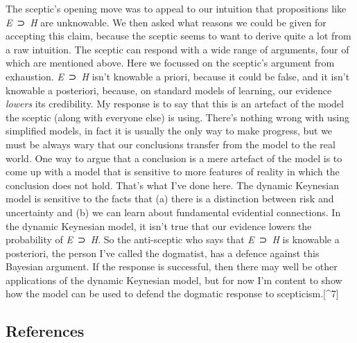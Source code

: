 \documentclass[
  10pt,
  letterpaper,
  DIV=11,
  numbers=noendperiod,
  twoside]{scrartcl}
\begin{document}
The sceptic's opening move was to appeal to our intuition that
propositions like \emph{E}~⊃~\emph{H} are unknowable. We then asked what
reasons we could be given for accepting this claim, because the sceptic
seems to want to derive quite a lot from a raw intuition. The sceptic
can respond with a wide range of arguments, four of which are mentioned
above. Here we focussed on the sceptic's argument from exhaustion.
\emph{E}~⊃~\emph{H} isn't knowable a priori, because it could be false,
and it isn't knowable a posteriori, because, on standard models of
learning, our evidence \emph{lowers} its credibility. My response is to
say that this is an artefact of the model the sceptic (along with
everyone else) is using. There's nothing wrong with using simplified
models, in fact it is usually the only way to make progress, but we must
be always wary that our conclusions transfer from the model to the real
world. One way to argue that a conclusion is a mere artefact of the
model is to come up with a model that is sensitive to more features of
reality in which the conclusion does not hold. That's what I've done
here. The dynamic Keynesian model is sensitive to the facts that (a)
there is a distinction between risk and uncertainty and (b) we can learn
about fundamental evidential connections. In the dynamic Keynesian
model, it isn't true that our evidence lowers the probability of
\emph{E}~⊃~\emph{H}. So the anti-sceptic who says that
\emph{E}~⊃~\emph{H} is knowable a posteriori, the person I've called the
dogmatist, has a defence against this Bayesian argument. If the response
is successful, then there may well be other applications of the dynamic
Keynesian model, but for now I'm content to show how the model can be
used to defend the dogmatic response to scepticism.{[}\^{}7{]}

\subsection*{References}\label{references}
\end{document}
